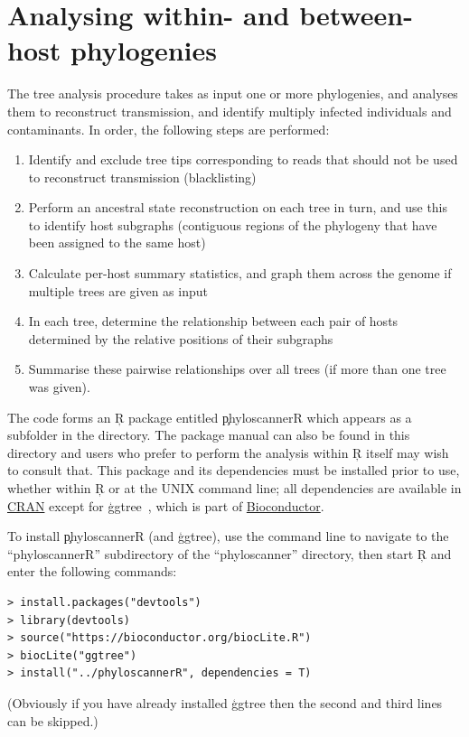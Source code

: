 \part{Analysing within- and between-host phylogenies}

The tree analysis procedure takes as input one or more phylogenies, and analyses them to reconstruct transmission, and identify multiply infected individuals and contaminants.
In order, the following steps are performed:

\begin{enumerate}
\item  Identify and exclude tree tips corresponding to reads that should not be used to reconstruct transmission (blacklisting)
\item Perform an ancestral state reconstruction on each tree in turn, and use this to identify host subgraphs (contiguous regions of the phylogeny that have been assigned to the same host)
\item Calculate per-host summary statistics, and graph them across the genome if multiple trees are given as input
\item In each tree, determine the relationship between each pair of hosts determined by the relative positions of their subgraphs
\item Summarise these pairwise relationships over all trees (if more than one tree was given).
\end{enumerate}

The code forms an \c{R} package entitled \c{phyloscannerR} which appears as a subfolder in the \p directory. The package manual can also be found in this directory and users who prefer to perform the analysis within \c{R} itself may wish to consult that. This package and its dependencies must be installed prior to use, whether within \c{R} or at the UNIX command line; all dependencies are available in \href{http://cran.r-project.org/}{CRAN} except for \c{ggtree}~\cite{MEE3:MEE312628}, which is part of \href{http://bioconductor.org/}{Bioconductor}.

To install \c{phyloscannerR} (and \c{ggtree}), use the command line to navigate to the ``phyloscannerR'' subdirectory of the ``phyloscanner'' directory, then start \c{R} and enter the following commands:
\begin{verbatim}
> install.packages("devtools")
> library(devtools)
> source("https://bioconductor.org/biocLite.R")
> biocLite("ggtree")
> install("../phyloscannerR", dependencies = T)
\end{verbatim}
(Obviously if you have already installed \c{ggtree} then the second and third lines can be skipped.) 



